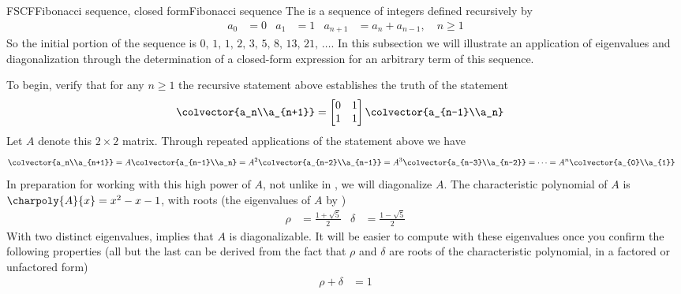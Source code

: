 \begin{example}{FSCF}{Fibonacci sequence, closed form}{Fibonacci sequence}
%
The  is a sequence of integers defined recursively by
%
\begin{align*}
a_0&=0
&
a_1&=1
&
a_{n+1}&=a_n+a_{n-1},\quad n\geq 1
\end{align*}
%
So the initial portion of the sequence is $0,\,1,\,1,\,2,\,3,\,5,\,8,\,13,\,21,\,\ldots$.  In this subsection we will illustrate an application of eigenvalues and diagonalization through the determination of a closed-form expression for an arbitrary term of this sequence.\par
%
To begin, verify that for any $n\geq 1$ the recursive statement above establishes the truth of the statement
%
\begin{align*}
\colvector{a_n\\a_{n+1}}
&=
\begin{bmatrix}0&1\\1&1\end{bmatrix}
\colvector{a_{n-1}\\a_n}
\end{align*}
%
Let $A$ denote this $2\times 2$ matrix.  Through repeated applications of the statement above we have
%
\begin{align*}
\colvector{a_n\\a_{n+1}}
&
=A\colvector{a_{n-1}\\a_n}
=A^2\colvector{a_{n-2}\\a_{n-1}}
=A^3\colvector{a_{n-3}\\a_{n-2}}
=\cdots
=A^n\colvector{a_{0}\\a_{1}}
\end{align*}
%
In preparation for working with this high power of $A$, not unlike in , we will diagonalize $A$.  The characteristic polynomial of $A$ is $\charpoly{A}{x}=x^2-x-1$, with roots  (the eigenvalues of $A$ by )
%
\begin{align*}
\rho&=\frac{1+\sqrt{5}}{2}
&
\delta&=\frac{1-\sqrt{5}}{2}
\end{align*}
%
With two distinct eigenvalues,  implies that $A$ is diagonalizable.  It will be easier to compute with these eigenvalues once you confirm the following properties (all but the last can be derived from the fact that $\rho$ and $\delta$ are roots of the characteristic polynomial, in a factored or unfactored form)
%
\begin{align*}
\rho+\delta&=1

\end{align*}
\end{example}
